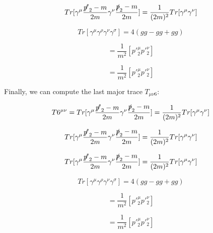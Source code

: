 \documentclass[a4]{article}
\begin{document}
    \begin{equation}
        Tr [\gamma^\mu \frac{\slashed{p'}_2 - m}{2m} \gamma^\nu \frac{\slashed{p}_2 - m}{2 m}] = \frac{1}{(2m)^2} Tr[\gamma^\mu \gamma^\nu]
    \end{equation}

    \begin{equation}
        Tr [\gamma^\mu \gamma^\rho \gamma^\nu \gamma^\sigma] = 4(g g - g g + g g)
    \end{equation}

    \begin{equation}
        = \frac{1}{m^2} [p'^{\mu}_2 p'^{\nu}_2]
    \end{equation}

    \begin{framed}
        \begin{equation}
            = \frac{1}{m^2} [p'^{\mu}_2 p'^{\nu}_2]
        \end{equation}
    \end{framed}

    Finally, we can compute the last major trace $T_{\mu \nu 6}$:

    \begin{equation}
        T6^{\mu \nu} = Tr [\gamma^\mu \frac{\slashed{p'}_2 - m}{2m} \gamma^\nu \frac{\slashed{p}_2 - m}{2 m}] = \frac{1}{(2m)^2} Tr[\gamma^\mu \gamma^\nu]
    \end{equation}

    \begin{equation}
        Tr [\gamma^\mu \frac{\slashed{p'}_2 - m}{2m} \gamma^\nu \frac{\slashed{p}_2 - m}{2 m}] = \frac{1}{(2m)^2} Tr[\gamma^\mu \gamma^\nu]
    \end{equation}

    \begin{equation}
        Tr [\gamma^\mu \frac{\slashed{p'}_2 - m}{2m} \gamma^\nu \frac{\slashed{p}_2 - m}{2 m}] = \frac{1}{(2m)^2} Tr[\gamma^\mu \gamma^\nu]
    \end{equation}

    \begin{equation}
        Tr [\gamma^\mu \gamma^\rho \gamma^\nu \gamma^\sigma] = 4(g g - g g + g g)
    \end{equation}

    \begin{equation}
        = \frac{1}{m^2} [p'^{\mu}_2 p'^{\nu}_2]
    \end{equation}

    \begin{framed}
        \begin{equation}
            = \frac{1}{m^2} [p'^{\mu}_2 p'^{\nu}_2]
        \end{equation}
    \end{framed}
\end{document}
